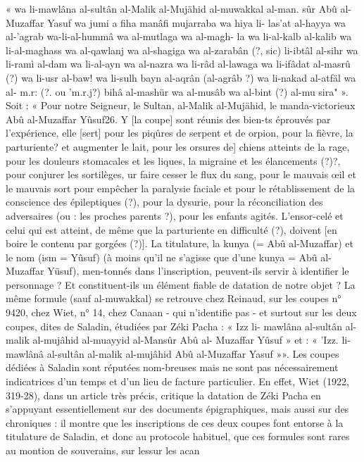 « wa li-mawlâna al-sultân al-Malik al-Mujähid al-muwakkal al-man.
sûr Abû al-Muzaffar Yasuf wa jumi a fiha manâfi mujarraba wa hiya li-
las'at al-hayya wa al-'agrab wa-li-al-hummâ wa al-mutlaga wa al-magh-
la wa li-al-kalb al-kalib wa li-al-maghass wa al-qawlanj wa al-shagiga
wa al-zarabân (?, sic) li-ibtâl al-sihr wa li-ramì al-dam wa li-al-ayn wa
al-nazra wa li-râd al-lawaga wa li-ifâdat al-masrû (?) wa li-usr al-baw!
wa li-sulh bayn al-aqrân (al-agrâb ?) wa li-nakad al-atfäl wa al- m.r: (?.
ou 'm.r.j?) bihâ al-mashür wa al-musâb wa al-bint (?) al-mu sira" ».
Soit : « Pour notre Seigneur, le Sultan, al-Malik al-Mujähid, le manda-victorieux Abû al-Muzaffar Yûsuf26. Y [la coupe] sont réunis des bien-ts éprouvés par l'expérience, elle [sert] pour les piqûres de serpent et de orpion, pour la fièvre, la parturiente? et augmenter le lait, pour les orsures de] chiens atteints de la rage, pour les douleurs stomacales et les liques, la migraine et les élancements (?)?, pour conjurer les sortilèges, ur faire cesser le flux du sang, pour le mauvais œil et le mauvais sort  
pour empêcher la paralysie faciale et pour le rétablissement de la conscience des épileptiques (?), pour la dysurie, pour la réconciliation des adversaires (ou : les proches parents ?), pour les enfants agités. L'ensor-celé et celui qui est atteint, de même que la parturiente en difficulté (?), doivent [en boire le contenu par gorgées (?)].
La titulature, la kunya (= Abû al-Muzaffar) et le nom (ism = Yûsuf) (à
moins qu'il ne s'agisse que d'une kunya = Abû al-Muzaffar Yüsuf), men-tonnés dans l'inscription, peuvent-ils servir à identifier le personnage ?
Et constituent-ils un élément fiable de datation de notre objet ? La même formule (sauf al-muwakkal) se retrouve chez Reinaud, sur les coupes n° 9420, chez Wiet, n° 14, chez Canaan - qui n'identifie pas - et surtout sur les deux coupes, dites de Saladin, étudiées par Zéki Pacha : « Izz li-
mawlâna al-sultân al-malik al-mujâhid al-muayyid al-Mansûr Abû al-
Muzaffar Yûsuf » et : « 'Izz. li-mawlânâ al-sultân al-malik al-mujâhid Abû al-Muzaffar Yasuf »». Les coupes dédiées à Saladin sont réputées nom-breuses   mais ne sont pas nécessairement indicatrices d'un temps et d'un lieu de facture particulier. En effet, Wiet (1922, 319-28), dans un article très précis, critique la datation de Zéki Pacha en s'appuyant essentiellement sur des documents épigraphiques, mais aussi sur des chroniques : il montre que les inscriptions de ces deux coupes font entorse à la titulature de Saladin, et donc au protocole habituel, que ces formules sont rares au
montion de souverains, sur lessur les acan
